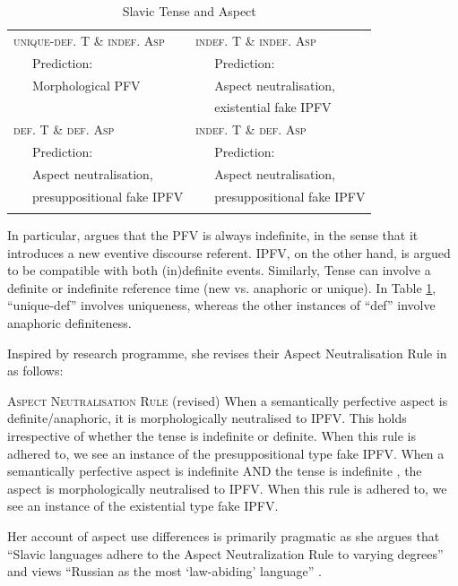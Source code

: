 \documentclass[output=paper,colorlinks,citecolor=brown]{langscibook}
\begin{document}
\begin{table}
	\caption{Slavic Tense and Aspect \citep[see][229]{alvestad13}}
	\label{tab:alv}
		\begin{tabularx}{.85\textwidth}{XX}
	  \lsptoprule
		\textsc{unique-def. T \& indef. Asp} 	&\textsc{indef. T \& indef. Asp}\\[0.25ex] 
        ~~~Prediction: &~~~Prediction:\\
        ~~~Morphological PFV &~~~Aspect neutralisation, \\
        &~~~existential fake IPFV\\[2ex]
		\textsc{def. T \& def. Asp} 	&\textsc{indef. T \& def. Asp}\\[0.25ex] 
        ~~~Prediction: &~~~Prediction:\\
        ~~~Aspect neutralisation, &~~~Aspect neutralisation, \\
        ~~~presuppositional fake IPFV &~~~presuppositional fake IPFV\\
	      \lspbottomrule
	\end{tabularx}
\end{table}


In particular, \citet{alvestad13} argues that the PFV is always indefinite, in the sense that it introduces a new eventive discourse referent. IPFV, on the other hand, is argued to be compatible with both (in)definite events. Similarly, Tense can involve a definite or indefinite reference time (new vs. an\-a\-phor\-ic or unique). In Table \ref{tab:alv}, ``unique-def'' involves uniqueness, whereas the other instances of ``def'' involve anaphoric definiteness.

Inspired by  research programme, she revises their Aspect Neutralisation Rule in  as follows:

\eanoraggedright \textsc{Aspect Neutralisation Rule} (revised) \citep[see][230]{alvestad13}\label{ex:aspneu}
\eanoraggedright When a semantically perfective aspect is definite/anaphoric, it is morphologically neutralised to IPFV. This holds irrespective of whether the tense is indefinite or definite. When this rule is adhered to, we see an instance of the presuppositional type fake IPFV.
\ex When a semantically perfective aspect is indefinite AND the tense is indefinite%
, the aspect is morphologically neutralised to IPFV. When this rule is adhered to, we see an instance of the existential type fake IPFV.
\z
\z 

\noindent Her account of aspect use differences is primarily pragmatic as she argues that ``Slavic languages adhere to the Aspect Neutralization Rule to varying degrees'' and views ``Russian as the most `law-abiding' language'' \citep[][312]{alvestad13}. 
\end{document}
